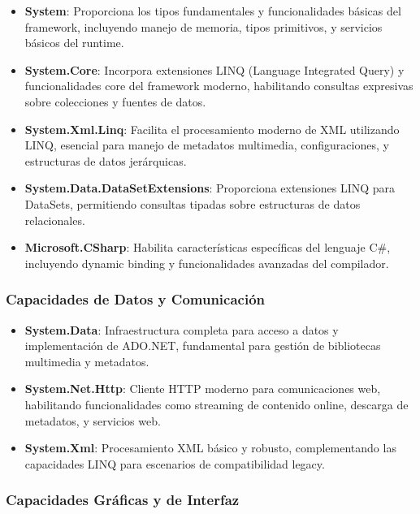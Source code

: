 \documentclass[a4paper]{article}
\begin{document}
\begin{itemize}
\item \textbf{System}: Proporciona los tipos fundamentales y funcionalidades básicas del framework, incluyendo manejo de memoria, tipos primitivos, y servicios básicos del runtime.

\item \textbf{System.Core}: Incorpora extensiones LINQ (Language Integrated Query) y funcionalidades core del framework moderno, habilitando consultas expresivas sobre colecciones y fuentes de datos.

\item \textbf{System.Xml.Linq}: Facilita el procesamiento moderno de XML utilizando LINQ, esencial para manejo de metadatos multimedia, configuraciones, y estructuras de datos jerárquicas.

\item \textbf{System.Data.DataSetExtensions}: Proporciona extensiones LINQ para DataSets, permitiendo consultas tipadas sobre estructuras de datos relacionales.

\item \textbf{Microsoft.CSharp}: Habilita características específicas del lenguaje C\#, incluyendo dynamic binding y funcionalidades avanzadas del compilador.
\end{itemize}

\subsubsection{Capacidades de Datos y Comunicación}

\begin{itemize}
\item \textbf{System.Data}: Infraestructura completa para acceso a datos y implementación de ADO.NET, fundamental para gestión de bibliotecas multimedia y metadatos.

\item \textbf{System.Net.Http}: Cliente HTTP moderno para comunicaciones web, habilitando funcionalidades como streaming de contenido online, descarga de metadatos, y servicios web.

\item \textbf{System.Xml}: Procesamiento XML básico y robusto, complementando las capacidades LINQ para escenarios de compatibilidad legacy.
\end{itemize}

\subsubsection{Capacidades Gráficas y de Interfaz}
\end{document}
